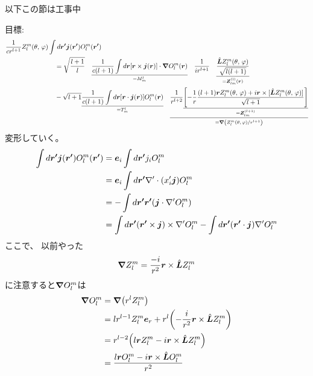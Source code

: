 \documentclass[../../master.tex]{subfiles}
\begin{document}
以下この節は工事中

\clearpage

目標:
\begin{align}
    \frac{1}{cr^{l+1}} Z_l^m(\theta,\,\varphi) &\int d\vb*{r'} \vb*{j}(\vb*{r'}) O_l^{m}(\vb*{r'})\notag\\
    &\quad=\sqrt{\frac{l+1}{l}}\quad\underset{=M_m^l}{\underline{\frac{1}{c(l+1)}\int d\vb*{r}[\vb*{r}\times \vb*{j}(\vb*{r})]\cdot \grad O_l^m(\vb*{r})}}
    \quad\frac{1}{ir^{l+1}}\quad\underset{=\vb*{Z}_{lm}^{(l)}(\vb*{r})}{\underline{\frac{\hat{\vb*{L}}Z_l^m(\theta,\,\varphi)}{\sqrt{l(l+1)}}}}\notag\\
    &\quad-\sqrt{l+1}\underset{=T_m^l}{\underline{\frac{1}{c(l+1)}\int d\vb*{r}[\vb*{r}\cdot \vb*{j}(\vb*{r})] O_l^m(\vb*{r})}}
    \quad\underset{=\grad(Z_l^m(\theta,\,\varphi)/r^{l+1})}{\underline{\frac{1}{r^{l+2}}\underset{=\vb*{Z}_{lm}^{(l+1)}}{\underline{\qty[-\frac{1}{r}\frac{(l+1)\vb*{r}Z_l^m(\theta,\,\varphi)+i\vb*{r}\times [\hat{\vb*{L}}Z_l^m(\theta,\,\varphi)]}{\sqrt{l+1}}]}}}}
\end{align}
変形していく。
\begin{align}
    \int d\vb*{r'} \vb*{j}(\vb*{r'}) O_l^{m}(\vb*{r'})
    &= \vb*{e}_i \int d\vb*{r'} j_i O_l^{m}\\
    &= \vb*{e}_i \int d\vb*{r'} \nabla'\cdot(x_i' \vb*{j}) O_l^m\\
    &= -\int d\vb*{r'} \vb*{r'} (\vb*{j}\cdot \nabla' O_l^m)\\
    &= \int d\vb*{r'} (\vb*{r'}\times\vb*{j})\times \nabla' O_l^m - \int d\vb*{r'} (\vb*{r'}\cdot\vb*{j})\nabla'O_l^m
\end{align}
ここで、
以前やった
\begin{equation}
    \grad Z_l^m = \frac{-i}{r^2}\vb*{r}\times \hat{\vb*{L}}Z_l^m
\end{equation}
に注意すると\(\grad O_l^m\)は
\begin{align}
    \grad O_l^m
    &= \grad(r^l Z_l^m)\\
    &= lr^{l-1}Z_l^m \vb*{e}_r +r^l\qty(-\frac{i}{r^2}\vb*{r}\times \hat{\vb*{L}}Z_l^m)\\
    &= r^{l-2}\qty(l\vb*{r}Z_l^m-i\vb*{r}\times\hat{\vb*{L}}Z_l^m)\\
    &=\frac{l\vb*{r}O_l^m-i\vb*{r}\times \hat{\vb*{L}}O_l^m}{r^2}
\end{align}
\end{document}
